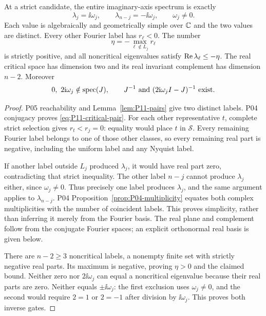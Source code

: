 \begin{theorem}
\label{thm:P11-strict}
At a strict candidate, the entire imaginary-axis spectrum is exactly
\begin{equation}
 \lambda_j=\ii\omega_j,\qquad
 \lambda_{n-j}=-\ii\omega_j,\qquad \omega_j\ne0.
 \label{eq:P11-critical-pair}
\end{equation}
Each value is algebraically and geometrically simple over $\mathbb{C}$ and the
two values are distinct. Every other Fourier label has $r_\ell<0$.
The number
\begin{equation}
 \eta=-\max_{\ell\notin L_j}r_\ell
 \label{eq:P11-gap}
\end{equation}
is strictly positive, and all noncritical eigenvalues satisfy
$\operatorname{Re}\lambda_\ell\le-\eta$. The real critical space has dimension
two and its real invariant complement has dimension $n-2$.
Moreover
\begin{equation}
 0,\ 2\ii\omega_j\notin\spec(J),\qquad
 J^{-1}\ \hbox{and}\ (2\ii\omega_j I-J)^{-1}\ \hbox{exist}.
 \label{eq:P11-resolvent-gates}
\end{equation}
\end{theorem}
\begin{proof}
P05 reachability and Lemma~\ref{lem:P11-pairs} give two distinct
labels. P04 conjugacy proves \eqref{eq:P11-critical-pair}.
For each other representative $t$, complete strict selection gives
$r_t<r_j=0$: equality would place $t$ in $\mathcal S$.
Every remaining Fourier label belongs to one of those other classes,
so every remaining real part is negative, including the uniform label
and any Nyquist label.

If another label outside $L_j$ produced $\lambda_j$, it would have
real part zero, contradicting that strict inequality. The other label
$n-j$ cannot produce $\lambda_j$ either, since $\omega_j\ne0$.
Thus precisely one label produces $\lambda_j$, and the same argument
applies to $\lambda_{n-j}$. P04
Proposition~\ref{prop:P04-multiplicity} equates both complex
multiplicities with the number of coincident labels. This proves
simplicity, rather than inferring it merely from the Fourier basis.
The real plane and complement follow from the conjugate Fourier
spaces; an explicit orthonormal real basis is given below.

There are $n-2\ge3$ noncritical labels, a nonempty finite set with
strictly negative real parts. Its maximum is negative, proving
$\eta>0$ and the claimed bound. Neither zero nor $2\ii\omega_j$
can equal a noncritical eigenvalue because their real parts are zero.
Neither equals $\pm\ii\omega_j$: the first exclusion uses
$\omega_j\ne0$, and the second would require $2=1$ or $2=-1$
after division by $\ii\omega_j$. This proves both inverse gates.
\end{proof}


